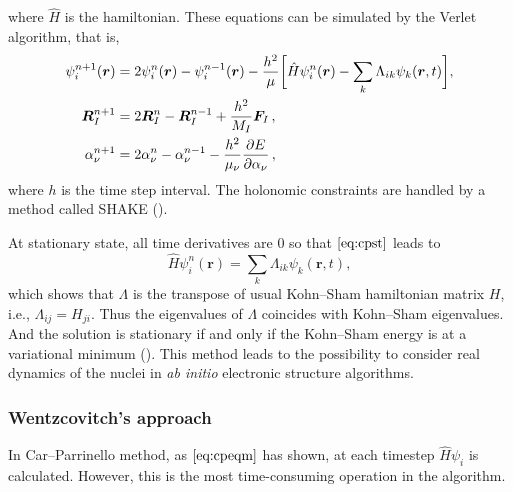 where $\hat{H}$ is the hamiltonian.
These equations can be simulated by the Verlet algorithm, that is,
\begin{subequations}
	\label{eq:cpeqm}
	\begin{align}
		\psi_i ^{n+1} (\bm{r}) & = 2 \psi_{i} ^ {n} (\bm{r}) -
		\psi_i ^{n-1} (\bm{r}) - \frac{ h^2 }{ \mu }
		\bigg[
			\hat{H} \psi_{i} ^ {n} (\bm{r}) - \sum_{k}
			\Lambda_{ik} \psi_k (\bm{r}, t)
			\bigg],\label{eq:cpst}\\
		\bm{R}_{I}^{n+1}       & = 2 \bm{R}_{I}^{n} - \bm{R}_{I}^{n-1} +
		\frac{ h^2 }{ M_I } \bm{F}_{I} \thinspace,\\
		\alpha_{\nu}^{n+1}     & = 2 \alpha_{\nu}^{n} -
		\alpha_{\nu}^{n-1} -
		\frac{ h^2 }{ \mu_{\nu} }
		\frac{ \partial E }{ \partial \alpha_{\nu} } \thinspace,
	\end{align}
\end{subequations}
where $h$ is the time step interval. The holonomic constraints are
handled by a method called SHAKE (\cite{Ryckaert:1977gp}).

At stationary state, all time derivatives are $0$ so that
$\eqref{eq:cpst}$ leads to
\begin{equation}
	\hat{H} \psi_{i} ^ {n} (\bm{r}) = \sum_{k}
	\Lambda_{ik} \psi_k (\bm{r}, t),
\end{equation}
which shows that $\Lambda$ is the transpose of
usual Kohn--Sham hamiltonian matrix
$H$, i.e., $\Lambda_{ij} = H_{ji}$. Thus the eigenvalues of
$\Lambda$ coincides with Kohn--Sham eigenvalues.
And the solution is stationary if and only if the Kohn--Sham
energy is at a variational minimum (\cite{martin2004electronic}).
This method leads to the possibility to consider real dynamics
of the nuclei in \textit{ab initio} electronic structure algorithms.


\subsubsection{Wentzcovitch's approach}

In Car--Parrinello method, as $\eqref{eq:cpeqm}$ has shown,
at each timestep $\hat{H} \psi_i$ is calculated. However, this is
the most time-consuming operation in the algorithm.

